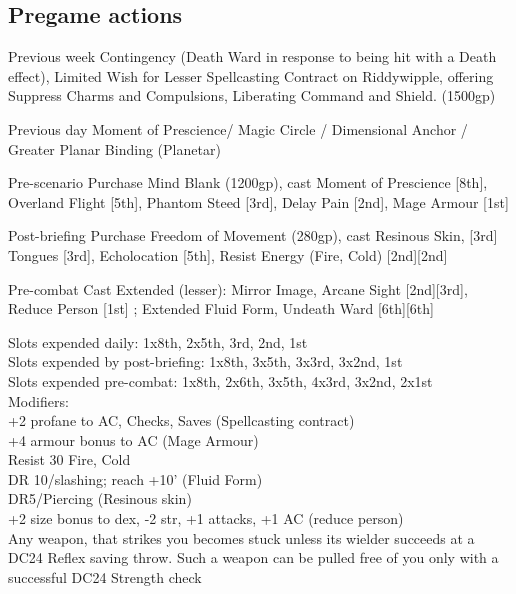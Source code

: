 {\subsection{Pregame actions}
\begin{compactenum}
 \item [Previous week] Contingency (Death Ward in response to being hit with a Death effect), Limited Wish for Lesser Spellcasting Contract on Riddywipple,
     offering Suppress Charms and Compulsions, Liberating Command and Shield. (1500gp)
 \item [Previous day]  Moment of Prescience/ Magic Circle / Dimensional Anchor / Greater Planar Binding (Planetar)
 \item [Pre-scenario] Purchase Mind Blank (1200gp), cast Moment of Prescience [8th], Overland Flight [5th], Phantom Steed [3rd], Delay Pain [2nd], Mage Armour [1st]
 \item [Post-briefing] Purchase Freedom of Movement (280gp), cast Resinous Skin, [3rd] Tongues [3rd], Echolocation [5th], Resist Energy (Fire, Cold) [2nd][2nd]
 \item [Pre-combat] Cast Extended (lesser): Mirror Image, Arcane Sight [2nd][3rd], Reduce Person [1st] ; Extended Fluid Form, Undeath Ward [6th][6th]
\end{compactenum}

Slots expended daily: 1x8th, 2x5th, 3rd, 2nd, 1st \\
Slots expended by post-briefing: 1x8th, 3x5th, 3x3rd, 3x2nd, 1st\\
Slots expended pre-combat: 1x8th, 2x6th, 3x5th, 4x3rd, 3x2nd, 2x1st\\

Modifiers: \\
+2 profane to AC, Checks, Saves (Spellcasting contract)\\
+4 armour bonus to AC (Mage Armour) \\
Resist 30 Fire, Cold \\
DR 10/slashing; reach +10' (Fluid Form) \\
DR5/Piercing (Resinous skin) \\
+2 size bonus to dex, -2 str, +1 attacks, +1 AC (reduce person) \\


Any weapon, that strikes you becomes stuck unless its wielder succeeds at a DC24 Reflex saving throw. Such a weapon can be pulled free of you 
only with a successful DC24 Strength check
}

\newcommand{\people}{
}

\newcommand{\scenariolist}{

}


\newcommand{\biography}{

}

